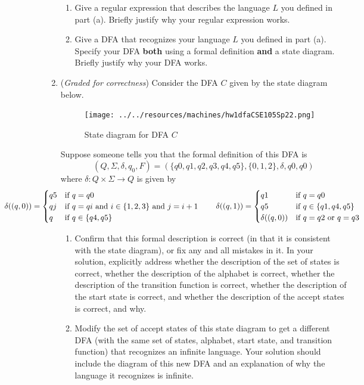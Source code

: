 \begin{enumerate}
\begin{enumerate}
\item Give a regular expression that describes the language $L$ you defined in part (a).  
Briefly justify why your regular expression
works.
\item Give a DFA that recognizes your language $L$ you defined in part (a).  
Specify your DFA {\bf both} using a formal definition
{\bf and} a state diagram. Briefly justify why your DFA works.
\end{enumerate}

\item ({\it Graded for correctness}) Consider the DFA $C$ given by the state diagram below.
\begin{figure}[h]
   \centering
   \texttt{[image: ../../resources/machines/hw1dfaCSE105Sp22.png]}
   \caption{State diagram for DFA $C$}
\end{figure}

Suppose someone tells you that the formal definition of this DFA is 
\[
(Q, \Sigma, \delta, q_0, F) =  (\{ q0, q1, q2, q3, q4, q5 \}, \{0,1,2\}, \delta, q0, q0)
\]
where $\delta: Q \times \Sigma \to Q$ is given by 
\[
\hspace{-1in}\delta ( (q, 0) ) = \begin{cases}
q5 & \text{if $q=q0$} \\
qj & \text{if $q=qi$ and $i \in \{1,2,3\}$ and $j=i+1$} \\
q & \text{if $q \in \{q4,q5\}$} \\
\end{cases}  \qquad \delta ( (q, 1) ) = \begin{cases}
    q1 & \text{if $q=q0$} \\
    q5 & \text{if $q \in \{q1,q4,q5\}$} \\
    \delta( (q,0) ) & \text{if $q=q2$ or $q=q3$} \\
    \end{cases}
\]
\begin{enumerate}
\item Confirm that this formal description is correct (in that it is consistent with the 
state diagram), or fix any and all mistakes in it.
In your solution, explicitly address whether the description of the set of states is correct, whether the 
description of the alphabet is correct, 
whether the description of the transition function is correct, 
whether the description of the start state is correct, and whether 
the description of the accept states is correct, and why.

\item Modify the set of accept states of this state diagram to get a different DFA 
(with the same set of states, alphabet, start state, and transition function) 
that recognizes an infinite language. Your solution should include the 
diagram of this new DFA and an explanation of why the language it recognizes
is infinite.
\end{enumerate}



\end{enumerate}
